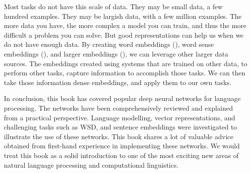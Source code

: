 \documentclass[12pt,parskip]{komatufte}
\begin{document}
Most tasks do not have this scale of data.
They may be small data, a few hundred examples.
They may be largish data, with a few million examples.
The more data you have, the more complex a model you can train,
and thus the more difficult a problem you can solve.
But good representations can help us when we do not have enough data.
By creating word embeddings (),
word sense embeddings (),
and larger embeddings (),
we can leverage other larger data sources.
The embeddings created using systems that are trained on other data, to perform other tasks,
capture information to accomplish those tasks.
We can then take those information dense embeddings, and apply them to our own tasks.

In conclusion,
this book has covered popular deep neural networks for language processing.
The networks have been comprehensively reviewed and explained from a practical perspective.
Language modelling, vector representations, and challenging tasks such as WSD, and sentence embeddings were  investigated to illustrate the use of these networks.
This book shares a lot of valuable advice obtained from first-hand experience in implementing these networks.
We would treat this book as a solid introduction to one of the most exciting new areas of natural language processing and computational linguistics.
\end{document}
